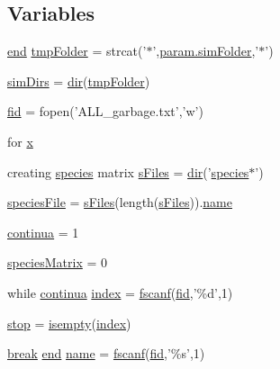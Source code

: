 \subsection*{Variables}
\begin{DoxyCompactItemize}
\item 
\hyperlink{a00025_afb358f48b1646c750fb9da6c6585be2b}{end} \hyperlink{a00027_ad509473eed851f9f5ff4157c02ec8618}{tmp\+Folder} = strcat('$\ast$',\hyperlink{a00032_aa671e3345005bd599e662bcaa115b18a}{param.\+sim\+Folder},'$\ast$')
\item 
\hyperlink{a00027_aae5035eb84b89176ed5b06e136325eff}{sim\+Dirs} = \hyperlink{a00113_a4ca269cf93df1b512b52174c1a256fe5}{dir}(\hyperlink{a00029_ad509473eed851f9f5ff4157c02ec8618}{tmp\+Folder})
\item 
\hyperlink{a00027_ae9011d40c6f13e68e6f07156e0da7c5d}{fid} = fopen('A\+L\+L\+\_\+garbage.\+txt','w')
\item 
for \hyperlink{a00027_a7265972fe485274cfff77a9bb07b8fce}{x}
\item 
creating \hyperlink{a00021}{species} matrix \hyperlink{a00027_a0cf551ea63e8b67362ae2ab776072d1f}{s\+Files} = \hyperlink{a00113_a4ca269cf93df1b512b52174c1a256fe5}{dir}('\hyperlink{a00021}{species}$\ast$')
\item 
\hyperlink{a00027_a7da0c82834970c5f3c3d9224ab832577}{species\+File} = \hyperlink{a00027_a0cf551ea63e8b67362ae2ab776072d1f}{s\+Files}(length(\hyperlink{a00027_a0cf551ea63e8b67362ae2ab776072d1f}{s\+Files})).\hyperlink{a00027_abbf559a76fab59203496b0847ab9502a}{name}
\item 
\hyperlink{a00027_a9c951ebd5bc3f1adce943bee1255f4d6}{continua} = 1
\item 
\hyperlink{a00027_aaeeccb9f4fc7b14ac6b4810a4bf9f71e}{species\+Matrix} = 0
\item 
while \hyperlink{a00030_a9c951ebd5bc3f1adce943bee1255f4d6}{continua} \hyperlink{a00027_a0cd6a44ffb07342cbc7e5ac33bfc9495}{index} = \hyperlink{a00025_a028ac102a731e62fb0a7439381f566c1}{fscanf}(\hyperlink{a00031_ae9011d40c6f13e68e6f07156e0da7c5d}{fid},'\%d',1)
\item 
\hyperlink{a00027_a6bd08e37edf4151f5f6d1fc27a6f227a}{stop} = \hyperlink{a00025_ac10445404f4b83302522defb59e25ef7}{isempty}(\hyperlink{a00102_a0cd6a44ffb07342cbc7e5ac33bfc9495}{index})
\item 
\hyperlink{a00029_a91cf6fbebedd86150a36e5ac3d5d3bfc}{break} \hyperlink{a00025_afb358f48b1646c750fb9da6c6585be2b}{end} \hyperlink{a00027_abbf559a76fab59203496b0847ab9502a}{name} = \hyperlink{a00025_a028ac102a731e62fb0a7439381f566c1}{fscanf}(\hyperlink{a00031_ae9011d40c6f13e68e6f07156e0da7c5d}{fid},'\%s',1)

\end{DoxyCompactItemize}
